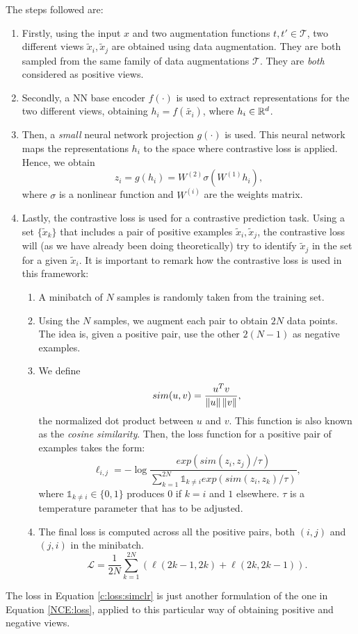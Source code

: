 The steps followed are:
\begin{enumerate}
\item Firstly, using the input $x$ and two augmentation functions $t,t' \in \mathcal T$, two different views $\tilde x_i,\tilde x_j$ are obtained using data augmentation. They are both sampled from the same family of data augmentations $\mathcal T$. They are \emph{both} considered as positive views.
\item Secondly, a NN base encoder $f(\cdot)$ is used to extract representations for the two different views, obtaining $h_i = f(\tilde{x_i})$, where $h_i \in \mathbb{R}^d$.  

\item Then, a \emph{small} neural network projection $g(\cdot)$ is used. This neural network maps the representations $h_i$ to the space where contrastive loss is applied. Hence, we obtain 
$$
z_i = g(h_i) = W^{(2)}\sigma(W^{(1)}h_i),$$
where $\sigma$ is a nonlinear function and $W^{(i)}$ are the weights matrix.

\item Lastly, the contrastive loss is used for a contrastive prediction task. Using a set $\{\tilde x_k \}$ that includes a pair of positive examples $\tilde x_i,\tilde x_j$, the contrastive loss will (as we have already been doing theoretically) try to identify $\tilde x_j$ in the set for a given $\tilde x_i$. It is important to remark how the contrastive loss is used in this framework:
\begin{enumerate}
\item A minibatch of $N$ samples is randomly taken from the training set. 
\item Using the $N$ samples, we augment each pair to obtain $2N$ data points. The idea is, given a positive pair, use the other $2(N-1)$ as negative examples.
\item We define
\[
sim(u,v) = \frac{u^T v}{\left\lVert u\right\rVert\left\lVert v\right\rVert},    
\]
the normalized dot product between $u$ and $v$. This function is also known as the \emph{cosine similarity}. Then, the loss function for a positive pair of examples takes the form:
\begin{equation}\label{c:loss:simclr:ind}
\ell_{i,j} = -\log \frac{exp(sim(z_i,z_j)/\tau)}{\sum_{k=1}^{2N} \mathbb{1}_{k \neq i} exp(sim(z_i,z_k)/\tau)},    
\end{equation}
where $\mathbb{1}_{k \neq i} \in \{0,1\}$ produces $0$ if $k = i$ and $1$ elsewhere. $\tau$ is a temperature parameter that has to be adjusted.
\item The final loss is computed across all the positive pairs, both $(i,j)$ and $(j,i)$ in the minibatch.
\begin{equation}\label{c:loss:simclr}
\mathcal L = \frac{1}{2N} \sum_{k=1}^{2N} \left(\ell(2k-1,2k) + \ell(2k,2k-1)\right).
\end{equation}
\end{enumerate}
\end{enumerate}
\begin{remark}
The loss in Equation \eqref{c:loss:simclr} is just another formulation of the one in Equation \eqref{NCE:loss}, applied to this particular way of obtaining positive and negative views.
\end{remark}

